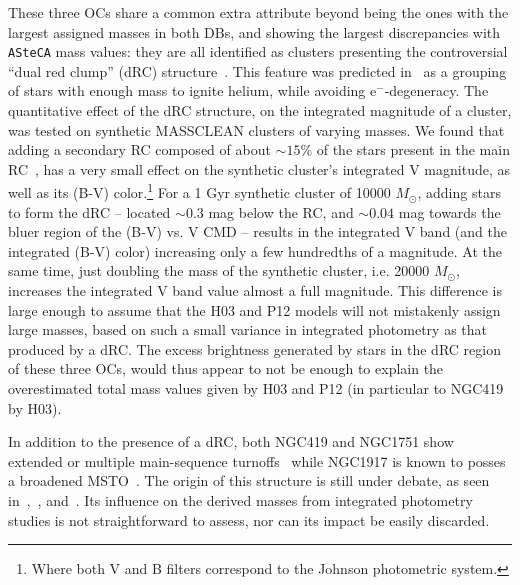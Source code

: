 \documentclass{aa}
\begin{document}
These three OCs share a common extra attribute beyond being the ones with
the largest assigned masses in both DBs, and showing the largest discrepancies
with \texttt{ASteCA} mass values: they are all identified as clusters
presenting the controversial ``dual red clump'' (dRC) structure~\citep
{Girardi_2009}.
This feature was predicted in~\cite{Girardi_1998} as a grouping of stars with
enough mass to ignite helium, while avoiding e$^-$-degeneracy.
%
%
%
The quantitative effect of the dRC structure, on the integrated magnitude of a
cluster, was tested on synthetic MASSCLEAN clusters of varying masses. We found
that adding a secondary RC composed of about ${\sim}15\%$ of the stars present
in the main RC~\citep[the approximate value found for NGC419 in][]
{Girardi_2009}, has a very small effect on the synthetic cluster's integrated V
magnitude, as well as its (B-V) color.\footnote{Where both V and B filters
correspond to the Johnson photometric system.}
%
For a 1 Gyr synthetic cluster of 10000 $M_{\odot}$, adding stars
to form the dRC -- located ${\sim}0.3$ mag below the RC, and
${\sim}0.04$ mag towards the bluer region of the (B-V) vs. V CMD -- results
in the integrated V band (and the integrated (B-V) color) increasing only
a few hundredths of a magnitude.
At the same time, just doubling the mass of the synthetic cluster, i.e.
20000 $M_{\odot}$, increases the integrated V band value almost a full
magnitude. This difference is large enough to assume that the H03 and P12
models will not mistakenly assign large masses, based on such a small variance
in integrated photometry as that produced by a dRC.\@
%
The excess brightness generated by stars in the dRC region of these three OCs,
would thus appear to not be enough to explain the overestimated total mass
values given by H03 and P12 (in particular to NGC419 by H03).

In addition to the presence of a dRC, both NGC419 and NGC1751 show
extended or multiple main-sequence turnoffs~\citep[MSTO; see:][]
{Glatt_2008,Milone_2009,Rubele_2010,Rubele_2011,Girardi_2011}
while NGC1917 is known to posses a broadened MSTO~\citep{Milone_2009}.
The origin of this structure is still under debate, as seen in~\cite
{Piatti_Bastian_2016},~\cite{Milone_2016}, and~\cite{Li_2016}.
Its influence on the derived masses from integrated photometry studies is not
straightforward to assess, nor can its impact be easily discarded.\\
\end{document}

